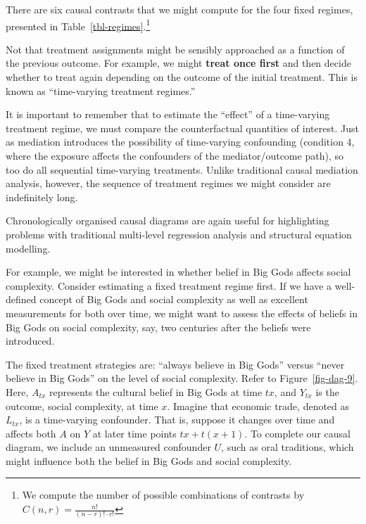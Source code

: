 \documentclass[
  singlecolumn]{report}
\begin{document}
There are six causal contrasts that we might compute for the four fixed
regimes, presented in Table~\ref{tbl-regimes}.\footnote{We compute the
  number of possible combinations of contrasts by
  \(C(n, r) = \frac{n!}{(n-r)! \cdot r!}\)}

Not that treatment assignments might be sensibly approached as a
function of the previous outcome. For example, we might \textbf{treat
once first} and then decide whether to treat again depending on the
outcome of the initial treatment. This is known as ``time-varying
treatment regimes.''

It is important to remember that to estimate the ``effect'' of a
time-varying treatment regime, we must compare the counterfactual
quantities of interest. Just as mediation introduces the possibility of
time-varying confounding (condition 4, where the exposure affects the
confounders of the mediator/outcome path), so too do all sequential
time-varying treatments. Unlike traditional causal mediation analysis,
however, the sequence of treatment regimes we might consider are
indefinitely long.

Chronologically organised causal diagrams are again useful for
highlighting problems with traditional multi-level regression analysis
and structural equation modelling.

For example, we might be interested in whether belief in Big Gods
affects social complexity. Consider estimating a fixed treatment regime
first. If we have a well-defined concept of Big Gods and social
complexity as well as excellent measurements for both over time, we
might want to assess the effects of beliefs in Big Gods on social
complexity, say, two centuries after the beliefs were introduced.

The fixed treatment strategies are: ``always believe in Big Gods''
versus ``never believe in Big Gods'' on the level of social complexity.
Refer to Figure~\ref{fig-dag-9}. Here, \(A_{tx}\) represents the
cultural belief in Big Gods at time \(tx\), and \(Y_{tx}\) is the
outcome, social complexity, at time \(x\). Imagine that economic trade,
denoted as \(L_{tx}\), is a time-varying confounder. That is, suppose it
changes over time and affects both \(A\) on \(Y\) at later time points
\(tx+t(x+1)\). To complete our causal diagram, we include an unmeasured
confounder \(U\), such as oral traditions, which might influence both
the belief in Big Gods and social complexity.
\end{document}
